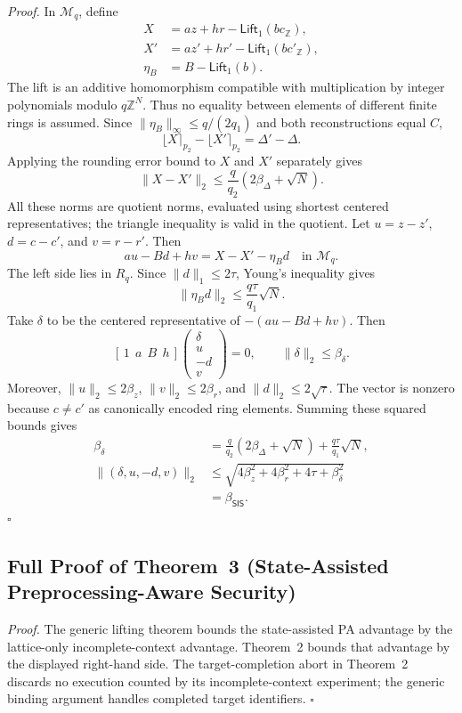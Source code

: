 \documentclass[lettersize,journal]{IEEEtran}
\begin{document}
	\emph{Proof.}
	In $\mathcal M_q$, define
	\[
	\begin{aligned}
		X&=az+hr-\mathsf{Lift}_1(bc_{\mathbb Z}),\\
		X'&=az'+hr'-\mathsf{Lift}_1(bc'_{\mathbb Z}),\\
		\eta_B&=B-\mathsf{Lift}_1(b).
	\end{aligned}
	\]
	The lift is an additive homomorphism compatible with multiplication by
	integer polynomials modulo $q\mathbb Z^N$. Thus no equality between
	elements of different finite rings is assumed. Since
	$\|\eta_B\|_\infty\leq q/(2q_1)$ and both reconstructions equal $C$,
	\[
	\lfloor X\rceil_{p_2}-\lfloor X'\rceil_{p_2}
	=\Delta'-\Delta.
	\]
	Applying the rounding error bound to $X$ and $X'$ separately gives
	\[
	\|X-X'\|_2
	\leq\frac q{q_2}\left(2\beta_\Delta+\sqrt N\right).
	\]
	All these norms are quotient norms, evaluated using shortest centered
	representatives; the triangle inequality is valid in the quotient.
	Let $u=z-z'$, $d=c-c'$, and $v=r-r'$. Then
	\[
	au-Bd+hv=X-X'-\eta_Bd\quad\text{in }\mathcal M_q.
	\]
	The left side lies in $R_q$. Since $\|d\|_1\leq2\tau$, Young's
	inequality gives
	\[
	\|\eta_Bd\|_2\leq\frac{q\tau}{q_1}\sqrt N.
	\]
	Take $\delta$ to be the centered representative of $-(au-Bd+hv)$.
	Then
	\[
	[\,1\ \ a\ \ B\ \ h\,]
	\begin{pmatrix}\delta\\u\\-d\\v\end{pmatrix}=0,
	\qquad \|\delta\|_2\leq\beta_\delta.
	\]
	Moreover, $\|u\|_2\leq2\beta_z$, $\|v\|_2\leq2\beta_r$, and
	$\|d\|_2\leq2\sqrt\tau$. The vector is nonzero because $c\ne c'$
	as canonically encoded ring elements. Summing these squared bounds gives
	\[
	\begin{aligned}
	\beta_\delta
	&=\frac q{q_2}\left(2\beta_\Delta+\sqrt N\right)
	+\frac{q\tau}{q_1}\sqrt N,\\
	\|(\delta,u,-d,v)\|_2
	&\leq\sqrt{4\beta_z^2+4\beta_r^2+4\tau+\beta_\delta^2}\\
	&=\beta_{\mathsf{SIS}}.
	\end{aligned}
	\]
	\hfill$\square$
	
	\subsection{Full Proof of Theorem~3 (State-Assisted Preprocessing-Aware Security)}
	\label{app:talon-theorem3-proof}
	
	\emph{Proof.}
	The generic lifting theorem bounds the
	state-assisted PA advantage by the lattice-only incomplete-context
	advantage. Theorem~2 bounds that advantage by the displayed
	right-hand side. The target-completion abort in Theorem~2 discards no
	execution counted by its incomplete-context experiment; the generic
	binding argument handles completed target identifiers.
	\hfill$\square$
	
\end{document}
